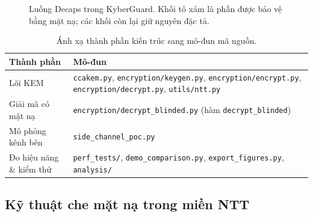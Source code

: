 \documentclass[../LuanVan.tex]{subfiles}
\begin{document}
\begin{figure}[H]
\centering
{}
\caption{Luồng Decaps trong KyberGuard. Khối tô xám là phần được bảo vệ bằng mặt nạ; các khối còn lại giữ nguyên đặc tả.}
\label{fig:arch}
\end{figure}
 
\begin{table}[H]
\centering
\caption{Ánh xạ thành phần kiến trúc sang mô-đun mã nguồn.}
\label{tab:modules}
\small
\begin{tabular}{@{}p{4.2cm}p{9cm}@{}}
\toprule
\textbf{Thành phần} & \textbf{Mô-đun} \\
\midrule
Lõi KEM & \texttt{ccakem.py}, \texttt{encryption/keygen.py}, \texttt{encryption/encrypt.py}, \texttt{encryption/decrypt.py}, \texttt{utils/ntt.py} \\
Giải mã có mặt nạ & \texttt{encryption/decrypt\_blinded.py} (hàm \texttt{decrypt\_blinded}) \\
Mô phỏng kênh bên & \texttt{side\_channel\_poc.py} \\
Đo hiệu năng \& kiểm thử & \texttt{perf\_tests/}, \texttt{demo\_comparison.py}, \texttt{export\_figures.py}, \texttt{analysis/} \\
\bottomrule
\end{tabular}
\end{table}
 
\subsection{Kỹ thuật che mặt nạ trong miền NTT}
 
\end{document}
